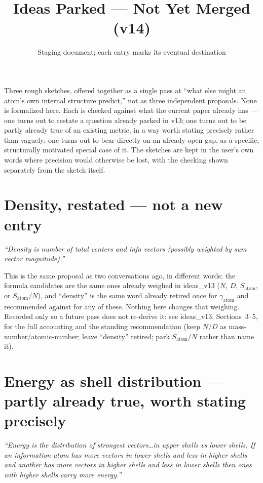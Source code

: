 \documentclass[11pt]{article}
\title{Ideas Parked --- Not Yet Merged (v14)}
\author{Staging document; each entry marks its eventual destination}
\date{}
\begin{document}
\maketitle

\noindent Three rough sketches, offered together as a single pass at
``what else might an atom's own internal structure predict,'' not as
three independent proposals. None is formalized here. Each is
checked against what the current paper already has --- one turns out
to restate a question already parked in v13; one turns out to be
partly already true of an existing metric, in a way worth stating
precisely rather than vaguely; one turns out to bear directly on an
already-open gap, as a specific, structurally motivated special case
of it. The sketches are kept in the user's own words where precision
would otherwise be lost, with the checking shown separately from the
sketch itself.

\section{Density, restated --- not a new entry}

\emph{``Density is number of total centers and info vectors
(possibly weighted by sum vector magnitude).''}

This is the same proposal as two conversations ago, in different
words: the formula candidates are the same ones already weighed in
ideas\_v13 (\(N\), \(D\), \(S_{\text{atom}}\), or
\(S_{\text{atom}}/N\)), and ``density'' is the same word already
retired once for \(\gamma_{\text{atom}}\) and recommended against for
any of these. Nothing here changes that weighing. Recorded only so a
future pass does not re-derive it: see ideas\_v13, Sections~3--5, for
the full accounting and the standing recommendation (keep \(N\)/\(D\)
as mass-number/atomic-number; leave ``density'' retired; park
\(S_{\text{atom}}/N\) rather than name it).

\section{Energy as shell distribution --- partly already true, worth
stating precisely}

\emph{``Energy is the distribution of strongest vectors\ldots in
upper shells vs lower shells. If an information atom has more
vectors in lower shells and less in higher shells and another has
more vectors in higher shells and less in lower shells then ones with
higher shells carry more energy.''}
\end{document}
